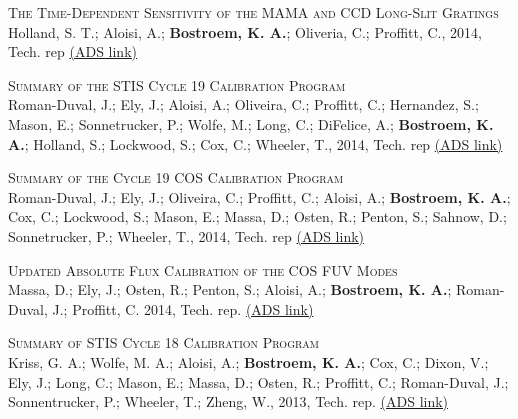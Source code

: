 \begin{revnumerate}[24]
\item{\textsc{The Time-Dependent Sensitivity of the MAMA and CCD Long-Slit Gratings}\\
Holland, S. T.; Aloisi, A.; {\bf Bostroem, K. A.}; Oliveria, C.; Proffitt, C.,  2014, Tech. rep 
\color{blue}\href{https://ui.adsabs.harvard.edu/#abs/2014stis.rept....2H/abstract}{(ADS link)}\color{black}}\\ %

\item{\textsc{Summary of the STIS Cycle 19 Calibration Program}\\
Roman-Duval, J.; Ely, J.; Aloisi, A.; Oliveira, C.; Proffitt, C.; Hernandez, S.; Mason, E.; Sonnetrucker, P.; Wolfe, M.; Long, C.; DiFelice, A.; \textbf{Bostroem, K. A.}; Holland, S.; Lockwood, S.; Cox, C.; Wheeler, T., 2014, Tech. rep 
\color{blue}\href{https://ui.adsabs.harvard.edu/#abs/2014stis.rept....1R/abstract}{(ADS link)}\color{black}}\\ %

\item{\textsc{Summary of the Cycle 19 COS Calibration Program}\\
Roman-Duval, J.; Ely, J.; Oliveira, C.; Proffitt, C.; Aloisi, A.; \textbf{Bostroem, K. A.}; Cox, C.; Lockwood, S.; Mason, E.; Massa, D.; Osten, R.; Penton, S.; Sahnow, D.; Sonnetrucker, P.; Wheeler, T., 2014, Tech. rep 
\color{blue}\href{https://ui.adsabs.harvard.edu/#abs/2014cos..rept....1R/abstract}{(ADS link)}\color{black}}\\ %

\item{\textsc{Updated Absolute Flux Calibration of the COS FUV Modes}\\
Massa, D.; Ely, J.; Osten, R.; Penton, S.; Aloisi, A.; \textbf{Bostroem, K. A.}; Roman-Duval, J.; Proffitt, C. 2014, Tech. rep. 
\color{blue}\href{https://ui.adsabs.harvard.edu/#abs/2014cos..rept....9M/abstract}{(ADS link)}\color{black}}\\ %

\item{\textsc{Summary of STIS Cycle 18 Calibration Program}\\
Kriss, G. A.; Wolfe, M. A.; Aloisi, A.; \textbf{Bostroem, K. A.}; Cox, C.; Dixon, V.; Ely, J.; Long, C.; Mason, E.; Massa, D.; Osten, R.; Proffitt, C.; Roman-Duval, J.; Sonnentrucker, P.; Wheeler, T.; Zheng, W., 2013, Tech. rep. 
\color{blue}\href{https://ui.adsabs.harvard.edu/#abs/2013stis.rept....3K/abstract}{(ADS link)}\color{black}}\\ %


\end{revnumerate}
